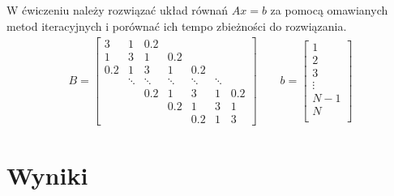 \documentclass[11pt]{extarticle}
\begin{document}
	\subsection{}
	W ćwiczeniu należy rozwiązać układ równań \(Ax = b\) za pomocą omawianych metod iteracyjnych i porównać ich tempo zbieżności do rozwiązania.
	\begin{align}
		B = \begin{bmatrix}
									3		& 1		& 0.2 \\
							1 		& 3		& 1		& 0.2 \\
					0.2		& 1		& 3		& 1		& 0.2 \\
			& 		\ddots	&\ddots &\ddots &\ddots &\ddots \\
			&&		0.2		& 1		& 3		& 1		& 0.2 \\
			&&&		0.2		& 1		& 3		& 1	\\
			&&&&	0.2		& 1		& 3
		\end{bmatrix} \qquad
		b = \begin{bmatrix}
			1 \\
			2 \\
			3 \\
			\vdots \\
			N-1 \\
			N \\
		\end{bmatrix}
	\end{align}
	
	\section{Wyniki}
\end{document}
